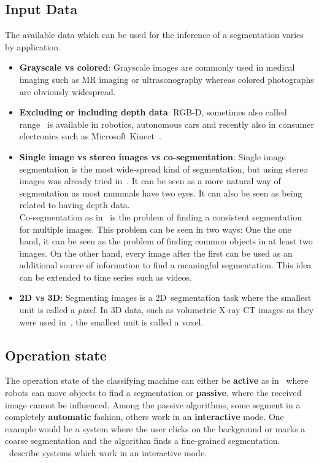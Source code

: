 \goodbreak
\subsection{Input Data}\label{subsec:input-data}
The available data which can be used for the inference of a segmentation varies
by application.

\begin{itemize}
    \item \textbf{Grayscale vs colored}: Grayscale images are commonly used in
          medical imaging such as \gls{MR} imaging or ultrasonography whereas
          colored photographs are obviously widespread.
    \item \textbf{Excluding or including depth data}: RGB-D, sometimes also
          called range~\cite{hoover1996experimental} is available in robotics,
          autonomous cars and recently also in consumer electronics such as
          Microsoft Kinect~\cite{6190806}.
    \item \textbf{Single image vs stereo images vs co-segmentation}: Single
          image segmentation is the most wide-spread kind of segmentation, but
          using stereo images was already tried in~\cite{boykov2001fast}. It
          can be seen as a more natural way of segmentation as most mammals
          have two eyes. It can also be seen as being related to having
          depth data.\\
          Co-segmentation as in~\cite{1640859,collins2012random} is the problem
          of finding a consistent segmentation for multiple images. This problem
          can be seen in two ways: One the one hand, it can be seen as the problem
          of finding common objects in at least two images. On the other hand,
          every image after the first can be used as an additional source of
          information to find a meaningful segmentation. This idea can be
          extended to time series such as videos.
    \item \textbf{2D vs 3D}: Segmenting images is a 2D~segmentation task where
          the smallest unit is called a \textit{pixel}. In 3D data, such as
          volumetric X-ray CT images as they were used in~\cite{929615}, the
          smallest unit is called a voxel.
\end{itemize}


\subsection{Operation state}\label{subsec:operation-state}
The operation state of the classifying machine can either be \textbf{active} as
in~\cite{schiebener2011segmentation,schiebener2012discovery} where robots can
move objects to find a segmentation or \textbf{passive}, where the received
image cannot be influenced. Among the passive algorithms, some segment in a
completely \textbf{automatic} fashion, others work in an \textbf{interactive}
mode. One example would be a system where the user clicks on the background or
marks a coarse segmentation and the algorithm finds a fine-grained
segmentation.
\cite{boykov2000interactive,rother2004grabcut,protiere2007interactive}~describe
systems which work in an interactive mode.

